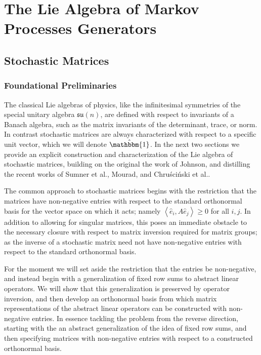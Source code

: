\chapter{The Lie Algebra of Markov Processes Generators}
\section{Stochastic Matrices}
\subsection{Foundational Preliminaries}

The classical Lie algebras of physics, like the infinitesimal symmetries
of the special unitary algebra $\mathfrak{su}(n)$, are defined with respect to
invariants of a Banach algebra, such as the matrix invariants of the 
determinant, trace, or norm. In contrast stochastic matrices are always 
characterized with respect to a specific unit vector, which we will denote 
$\hat{\mathbbm{1}}$. In the next two sections we provide an explicit 
construction and characterization of the Lie algebra of stochastic matrices, 
building on the original the work of Johnson\cite{johnson_markov-type_1985}, and
distilling the recent works of Sumner et al.\cite{sumner_lie_2012,fernandez-sanchez_lie_2012},
Mourad\cite{mourad_lie-theoretic_2004}, and Chruściński et al.\cite{chruscinski_pseudo-stochastic_2015}.

The common approach to stochastic matrices begins with the restriction that the 
matrices have non-negative entries with respect to the standard orthonormal 
basis for the vector space on which it acts; namely $\left\langle\hat{e}_i,A \hat{e}_j\right\rangle \ge 0$
for all $i,j$. In addition to allowing for singular matrices, this poses an 
immediate obstacle to the necessary closure with respect to matrix inversion 
required for matrix groups; as the inverse of a stochastic matrix need not have 
non-negative entries with respect to the standard orthonormal basis. 

For the moment we will set aside the restriction that the entries be 
non-negative, and instead begin with a generalization of fixed row sums to 
abstract linear operators. We will show that this generalization is preserved by 
operator inversion, and then develop an orthonormal basis from which matrix 
representations of the abstract linear operators can be constructed with 
non-negative entries. In essence tackling the problem from the reverse 
direction, starting with the an abstract generalization of the idea of fixed row 
sums, and then specifying matrices with non-negative entries with respect to a 
constructed orthonormal basis.

